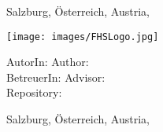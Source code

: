\begin{titlepage}
{    \vfill
    
    Salzburg, \ifhcilanguagegerman Österreich, \else Austria, \fi  \thesisdate
    }

\else %

    \begin{center}
    
    \texttt{[image: images/FHSLogo.jpg]}


    \vspace*{4cm}
    
    \fontsize{20.79}{18pt}{\selectfont        
    	\textit{\textbf{\titlename}}
    }
    
    \vspace*{4cm}
    
    \fontsize{20.79}{18pt}{%
    \ifhcilanguagegerman
      \textbf{ \ifhcipaper Seminararbeit \else Bachelorarbeit \fi }
    \else
        \textbf{ \ifhcipaper Seminararbeit \else Bachelor Thesis \fi }
    \fi
    }
    
    
    \end{center}
    
    \vfill
    
    \ifhcilanguagegerman AutorIn: \else Author: \fi  \authorname  \\
    \ifhcilanguagegerman BetreuerIn: \else Advisor: \fi \advisor \\
    Repository: \thesisrepo \\
    
    Salzburg, \ifhcilanguagegerman Österreich, \else Austria, \fi \thesisdate
    
    
    

\fi

\end{titlepage}
